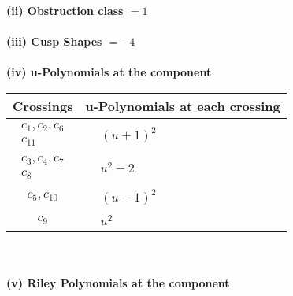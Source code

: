 \documentclass[1p]{elsarticle_modified}
\theoremstyle{definition}
\begin{document}
\flushleft \textbf{(ii) Obstruction class $= 1$}\\~\\
\flushleft \textbf{(iii) Cusp Shapes $= -4$}\\~\\
\newpage\renewcommand{\arraystretch}{1}
\flushleft \textbf{(iv) u-Polynomials at the component}\newline \\
\begin{tabular}{m{50pt}|m{274pt}}
Crossings & \hspace{64pt}u-Polynomials at each crossing \\
\hline $$\begin{aligned}c_{1},c_{2},c_{6}\\c_{11}\end{aligned}$$&$\begin{aligned}
&(u+1)^2
\end{aligned}$\\
\hline $$\begin{aligned}c_{3},c_{4},c_{7}\\c_{8}\end{aligned}$$&$\begin{aligned}
&u^2-2
\end{aligned}$\\
\hline $$\begin{aligned}c_{5},c_{10}\end{aligned}$$&$\begin{aligned}
&(u-1)^2
\end{aligned}$\\
\hline $$\begin{aligned}c_{9}\end{aligned}$$&$\begin{aligned}
&u^2
\end{aligned}$\\
\hline
\end{tabular}\\~\\
\newpage\renewcommand{\arraystretch}{1}
\flushleft \textbf{(v) Riley Polynomials at the component}\newline \\
\end{document}
